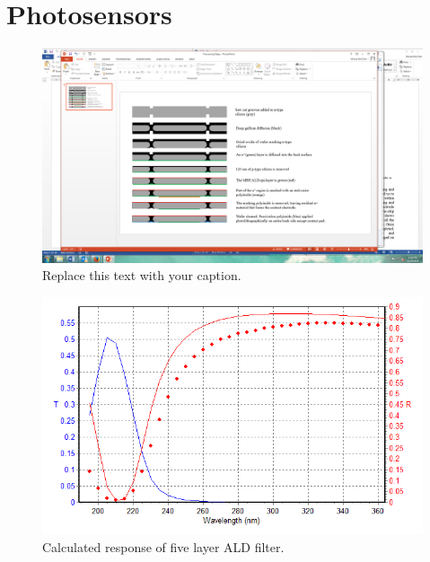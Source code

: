 \section{Photosensors}

\begin{figure}[h!]
\begin{center}
\includegraphics[width=0.7\columnwidth]{Figures/RMD_process.png}
\caption{Replace this text with your caption.}
\end{center}
\end{figure}

\begin{figure}[h!]
\begin{center}
\includegraphics[width=0.7\columnwidth]{Figures/fivelayer.png}
\caption{Calculated response of five layer ALD filter.}
\end{center}
\end{figure}
